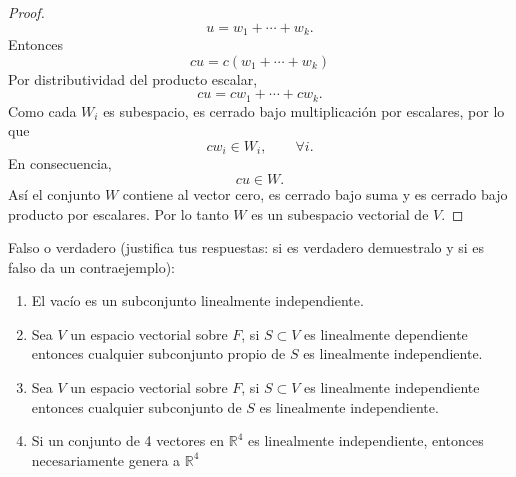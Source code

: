 \documentclass[12pt,a4paper]{article}
\begin{document}
\begin{proof}
        \begin{equation*}
            u=w_{1}+\cdots+w_{k}.
        \end{equation*}
        Entonces
        \begin{equation*}
            cu=c(w_{1}+\cdots+w_{k})
        \end{equation*}
        Por distributividad del producto escalar,
        \begin{equation*}
            cu=cw_{1}+\cdots+cw_{k}.
        \end{equation*}
        Como cada $W_{i}$ es subespacio, es cerrado bajo multiplicación por escalares, por lo que
        \begin{equation*}
            cw_{i}\in W_{i},\qquad \forall i.
        \end{equation*}
        En consecuencia,
        \begin{equation*}
            cu\in W.
        \end{equation*}
        Así el conjunto $W$ contiene al vector cero, es cerrado bajo suma y es cerrado bajo
        producto por escalares. Por lo tanto $W$ es un subespacio vectorial de $V$.
    \end{proof}

    \begin{mdframed}[style=mdbluebox,frametitle={EJercicio 2}]
        Falso o verdadero (justifica tus respuestas: si es verdadero
        demuestralo y si es falso da un contraejemplo):
        \begin{enumerate}
            \item[(a)] El vacío es un subconjunto linealmente independiente.
            \item[(b)] Sea $V$ un espacio vectorial sobre $F$, si $S\subset V$
            es linealmente dependiente entonces cualquier subconjunto propio
            de $S$ es linealmente independiente.
            \item[(c)] Sea $V$ un espacio vectorial sobre $F$, si $S\subset V$
            es linealmente independiente entonces cualquier subconjunto
            de $S$ es linealmente independiente.
            \item[(d)] Si un conjunto de 4 vectores en $\mathbb{R}^{4}$ es
            linealmente independiente, entonces necesariamente genera a $\mathbb{R}^{4}$
        \end{enumerate}
    \end{mdframed}
\end{document}
